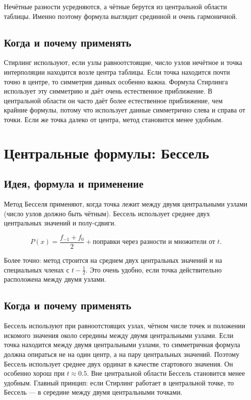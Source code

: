 \documentclass[12pt,a4paper]{article}
\begin{document}
Нечётные разности усредняются, а чётные берутся из центральной области таблицы. Именно поэтому формула выглядит срединной и очень гармоничной.

\subsection{Когда и почему применять}

Стирлинг используют, если узлы равноотстоящие, число узлов нечётное и точка интерполяции находится возле центра таблицы. Если точка находится почти точно в центре, то симметрия данных особенно важна. Формула Стирлинга использует эту симметрию и даёт очень естественное приближение. В центральной области он часто даёт более естественное приближение, чем крайние формулы, потому что использует данные симметрично слева и справа от точки. Если же точка далеко от центра, метод становится менее удобным.

\section{Центральные формулы: Бессель}
\subsection{Идея, формула и применение}

Метод Бесселя применяют, когда точка лежит между двумя центральными узлами (число узлов должно быть чётным). Бессель использует среднее двух центральных значений и полу-сдвиги.

\begin{formbox}
\[
P(x)=\frac{f_{-1}+f_0}{2}+\text{поправки через разности и множители от $t$}.
\]
\end{formbox}

Более точно: метод строится на среднем двух центральных значений и на специальных членах с $t-\frac12$. Это очень удобно, если точка действительно расположена между двумя узлами.

\subsection{Когда и почему применять}

Бессель используют при равноотстоящих узлах, чётном числе точек и положении искомого значения около середины между двумя центральными узлами. Если точка находится между двумя центральными узлами, то симметричная формула должна опираться не на один центр, а на пару центральных значений. Поэтому Бессель использует среднее двух ординат в качестве стартового значения. Он особенно хорош при $t\approx0.5$. Вне центральной области Бессель становится менее удобным. Главный принцип: если Стирлинг работает в центральной точке, то Бессель --- в середине между двумя центральными точками.
\end{document}

